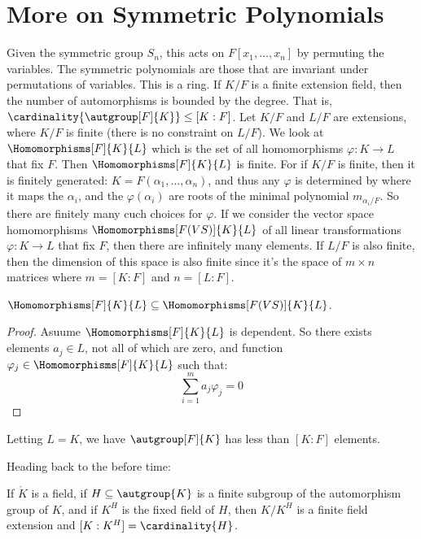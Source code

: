 \section{More on Symmetric Polynomials}
    Given the symmetric group $S_{n}$, this acts on $F[x_{1},\dots,x_{n}]$
    by permuting the variables. The symmetric polynomials are those that are
    invariant under permutations of variables. This is a ring.
    If $K/F$ is a finite extension field, then the number of automorphisms
    is bounded by the degree. That is,
    $\cardinality{\autgroup[F]{K}}\leq[K:F]$. Let $K/F$ and $L/F$ are
    extensions, where $K/F$ is finite (there is no constraint on $L/F$). We
    look at $\Homomorphisms[F]{K}{L}$ which is the set of all homomorphisms
    $\varphi:K\rightarrow{L}$ that fix $F$. Then $\Homomorphisms[F]{K}{L}$
    is finite. For if $K/F$ is finite, then it is finitely generated:
    $K=F(\alpha_{1},\dots,\alpha_{n})$, and thus any $\varphi$ is determined
    by where it maps the $\alpha_{i}$, and the $\varphi(\alpha_{i})$ are
    roots of the minimal polynomial $m_{\alpha_{i}/F}$. So there are
    finitely many cuch choices for $\varphi$. If we consider the vector
    space homomorphisms $\Homomorphisms[F(VS)]{K}{L}$ of all linear
    transformations $\varphi:K\rightarrow{L}$ that fix $F$, then there are
    infinitely many elements. If $L/F$ is also finite, then the dimension
    of this space is also finite since it's the space of $m\times{n}$
    matrices where $m=[K:F]$ and $n=[L:F]$.
    \begin{theorem}
        $\Homomorphisms[F]{K}{L}\subseteq\Homomorphisms[F(VS)]{K}{L}$.
    \end{theorem}
    \begin{proof}
        Asuume $\Homomorphisms[F]{K}{L}$ is dependent. So there exists
        elements $a_{j}\in{L}$, not all of which are zero, and function
        $\varphi_{j}\in\Homomorphisms[F]{K}{L}$ such that:
        \begin{equation}
            \sum_{i=1}^{m}a_{j}\varphi_{j}=0
        \end{equation}
    \end{proof}
    \begin{theorem}
        Letting $L=K$, we have $\autgroup[F]{K}$ has less than $[K:F]$
        elements.
    \end{theorem}
    Heading back to the before time:
    \begin{theorem}
        If $\ring{K}$ is a field, if $H\subseteq\autgroup{K}$ is a finite
        subgroup of the automorphism group of $K$, and if $K^{H}$ is the
        fixed field of $H$, then $K/K^{H}$ is a finite field extension and
        $[K:K^{H}]=\cardinality{H}$.
    \end{theorem}
